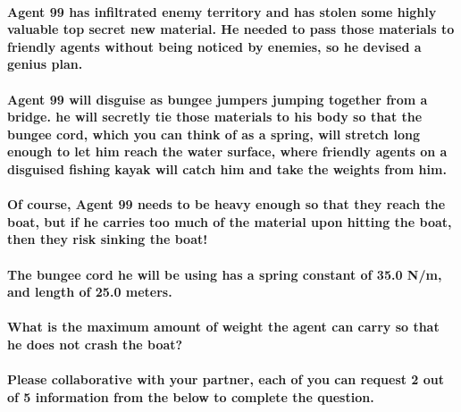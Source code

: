 \paragraph{Agent 99 has infiltrated enemy territory and has stolen some highly valuable top secret new material. He needed to pass those materials to friendly agents without being noticed by enemies, so he devised a genius plan.\newline}
\paragraph{Agent 99 will disguise as bungee jumpers jumping together from a bridge. he will secretly tie those materials to his body so that the bungee cord, which you can think of as a spring, will stretch long enough to let him reach the water surface, where friendly agents on a disguised fishing kayak will catch him and take the weights from him.
\newline}
\paragraph{Of course, Agent 99 needs to be heavy enough so that they reach the boat, but if he carries too much of the material upon hitting the boat, then they risk sinking the boat!\newline}
\paragraph{The bungee cord he will be using has a spring constant of 35.0 N/m, and length of 25.0 meters. \newline}

\paragraph{What is the maximum amount of weight the agent can carry so that he does not crash the boat?\newline}

\paragraph{Please collaborative with your partner, each of you can request 2 out of 5 information from the below to complete the question.\newline}